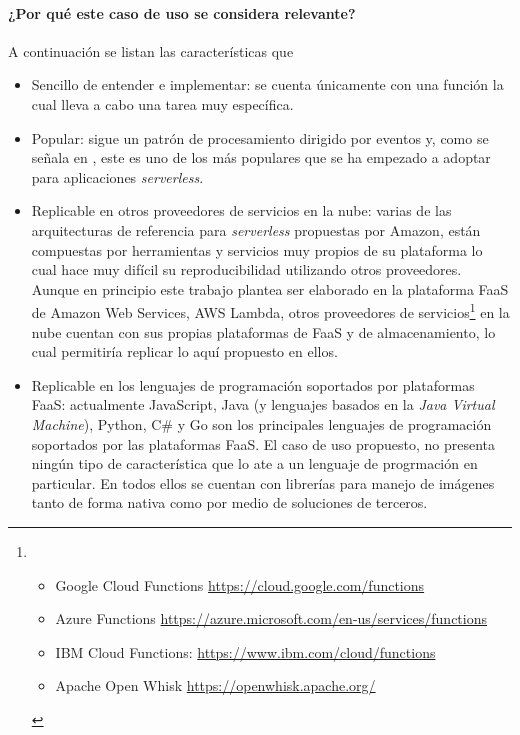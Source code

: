 \paragraph{¿Por qué este caso de uso se considera relevante?}
A continuación se listan las características que 
\begin{itemize}
    \item Sencillo de entender e implementar: se cuenta únicamente con una función la cual lleva a cabo una tarea muy específica.
    \item Popular: sigue un patrón de procesamiento dirigido por eventos y, como se señala en \cite{serverless-architecture-patterns}, este es uno de los más populares que se ha empezado a adoptar para aplicaciones \emph{serverless}.
    \item Replicable en otros proveedores de servicios en la nube: varias de las arquitecturas de referencia para \emph{serverless} propuestas por Amazon, están compuestas por herramientas y servicios muy propios de su plataforma lo cual hace muy difícil su reproducibilidad utilizando otros proveedores. Aunque en principio este trabajo plantea ser elaborado en la plataforma FaaS de Amazon Web Services, AWS Lambda, otros proveedores de servicios\footnote{\begin{itemize}\item[] Google Cloud Functions \url{https://cloud.google.com/functions} \item[] Azure Functions \url{https://azure.microsoft.com/en-us/services/functions} \item[] IBM Cloud Functions: \url{https://www.ibm.com/cloud/functions} \item[] Apache Open Whisk \url{https://openwhisk.apache.org/}  \end{itemize}} en la nube cuentan con sus propias plataformas de FaaS y de almacenamiento, lo cual permitiría replicar lo aquí propuesto en ellos.
    \item Replicable en los lenguajes de programación soportados por plataformas FaaS: actualmente JavaScript, Java (y lenguajes basados en la \emph{Java Virtual Machine}), Python, C\# y Go son los principales lenguajes de programación soportados por las plataformas FaaS. El caso de uso propuesto, no presenta ningún tipo de característica que lo ate a un lenguaje de progrmación en particular. En todos ellos se cuentan con librerías para manejo de imágenes tanto de forma nativa como por medio de soluciones de terceros. 
\end{itemize}

